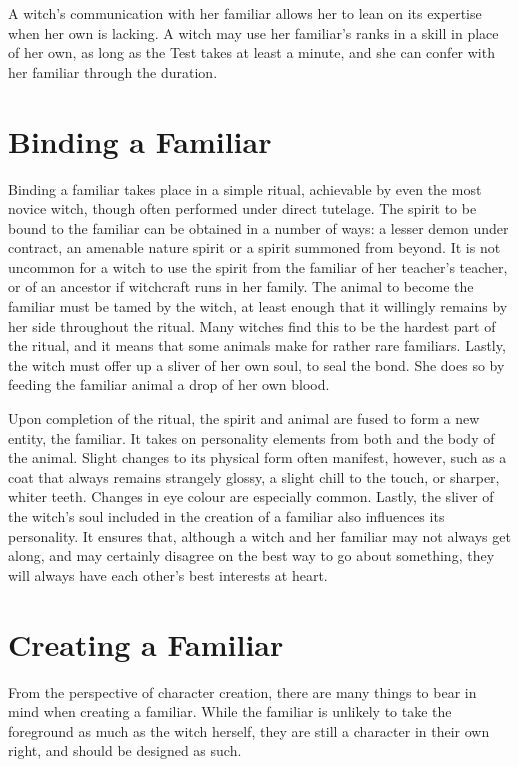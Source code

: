 A witch's communication with her familiar allows her to lean on its expertise when her own is lacking.
A witch may use her familiar's ranks in a skill in place of her own, as long as the Test takes at least a minute, and she can confer with her familiar through the duration.

\section{Binding a Familiar}

Binding a familiar takes place in a simple ritual, achievable by even the most novice witch, though often performed under direct tutelage.
The spirit to be bound to the familiar can be obtained in a number of ways: a lesser demon under contract, an amenable nature spirit or a spirit summoned from beyond.
It is not uncommon for a witch to use the spirit from the familiar of her teacher's teacher, or of an ancestor if witchcraft runs in her family.
The animal to become the familiar must be tamed by the witch, at least enough that it willingly remains by her side throughout the ritual.
Many witches find this to be the hardest part of the ritual, and it means that some animals make for rather rare familiars.
Lastly, the witch must offer up a sliver of her own soul, to seal the bond.
She does so by feeding the familiar animal a drop of her own blood.

Upon completion of the ritual, the spirit and animal are fused to form a new entity, the familiar.
It takes on personality elements from both and the body of the animal.
Slight changes to its physical form often manifest, however, such as a coat that always remains strangely glossy, a slight chill to the touch, or sharper, whiter teeth.
Changes in eye colour are especially common.
Lastly, the sliver of the witch's soul included in the creation of a familiar also influences its personality.
It ensures that, although a witch and her familiar may not always get along, and may certainly disagree on the best way to go about something, they will always have each other's best interests at heart.

\section{Creating a Familiar}

From the perspective of character creation, there are many things to bear in mind when creating a familiar.
While the familiar is unlikely to take the foreground as much as the witch herself, they are still a character in their own right, and should be designed as such.

